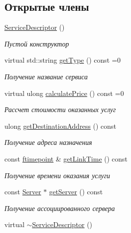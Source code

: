 \subsection*{Открытые члены}
\begin{DoxyCompactItemize}
\item 
\hyperlink{class_network_service_1_1_service_descriptor_a18e78e84c574141558bf4bf4ca2dc8a2}{Service\+Descriptor} ()
\begin{DoxyCompactList}\small\item\em Пустой конструктор \end{DoxyCompactList}\item 
virtual std\+::string \hyperlink{class_network_service_1_1_service_descriptor_ac09d5d704a67a7ab2df6d925751ee5cc}{get\+Type} () const =0
\begin{DoxyCompactList}\small\item\em Получение название сервиса \end{DoxyCompactList}\item 
virtual ulong \hyperlink{class_network_service_1_1_service_descriptor_aa2da86b27ac53d8acb1eddf3723a1e44}{calculate\+Price} () const =0
\begin{DoxyCompactList}\small\item\em Рассчет стоимости оказанных услуг \end{DoxyCompactList}\item 
ulong \hyperlink{class_network_service_1_1_service_descriptor_a3717f7dc804127c03d19592e26d7cb9c}{get\+Destination\+Address} () const 
\begin{DoxyCompactList}\small\item\em Получение адреса назначения \end{DoxyCompactList}\item 
const \hyperlink{networkservice_8h_ac877dfabb0f4f6a8184aa821b447e81d}{ftimepoint} \& \hyperlink{class_network_service_1_1_service_descriptor_a0b854ff7100ce01e7f34ca19299bea35}{get\+Link\+Time} () const 
\begin{DoxyCompactList}\small\item\em Получение времени оказания услуги \end{DoxyCompactList}\item 
const \hyperlink{class_network_service_1_1_server}{Server} $\ast$ \hyperlink{class_network_service_1_1_service_descriptor_aeea7b729a1d6dd25fa3fdedd59d3a050}{get\+Server} () const 
\begin{DoxyCompactList}\small\item\em Получение ассоциированного сервера \end{DoxyCompactList}\item 
virtual \hyperlink{class_network_service_1_1_service_descriptor_afc486ca8470d1722103e196284e5f77b}{$\sim$\+Service\+Descriptor} ()
\end{DoxyCompactItemize}
